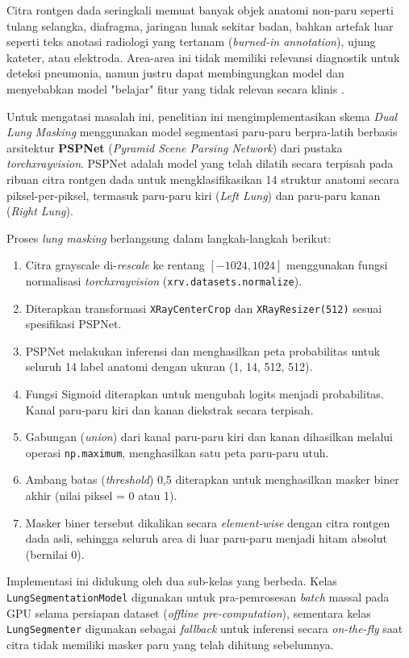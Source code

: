 \documentclass[12pt,a4paper,oneside]{book}
\begin{document}
Citra rontgen dada seringkali memuat banyak objek anatomi non-paru seperti tulang selangka, diafragma, jaringan lunak sekitar badan, bahkan artefak luar seperti teks anotasi radiologi yang tertanam (\textit{burned-in annotation}), ujung kateter, atau elektroda. Area-area ini tidak memiliki relevansi diagnostik untuk deteksi pneumonia, namun justru dapat membingungkan model dan menyebabkan model "belajar" fitur yang tidak relevan secara klinis \parencite{teixeira2020, azimi2022}.

Untuk mengatasi masalah ini, penelitian ini mengimplementasikan skema \textit{Dual Lung Masking} menggunakan model segmentasi paru-paru berpra-latih berbasis arsitektur \textbf{PSPNet} (\textit{Pyramid Scene Parsing Network}) dari pustaka \textit{torchxrayvision}. PSPNet adalah model yang telah dilatih secara terpisah pada ribuan citra rontgen dada untuk mengklasifikasikan 14 struktur anatomi secara piksel-per-piksel, termasuk paru-paru kiri (\textit{Left Lung}) dan paru-paru kanan (\textit{Right Lung}).

Proses \textit{lung masking} berlangsung dalam langkah-langkah berikut:
\begin{enumerate}
  \item Citra grayscale di-\textit{rescale} ke rentang $[-1024, 1024]$ menggunakan fungsi normalisasi \textit{torchxrayvision} (\texttt{xrv.datasets.normalize}).
  \item Diterapkan transformasi \texttt{XRayCenterCrop} dan \texttt{XRayResizer(512)} sesuai spesifikasi PSPNet.
  \item PSPNet melakukan inferensi dan menghasilkan peta probabilitas untuk seluruh 14 label anatomi dengan ukuran (1, 14, 512, 512).
  \item Fungsi Sigmoid diterapkan untuk mengubah logits menjadi probabilitas. Kanal paru-paru kiri dan kanan diekstrak secara terpisah.
  \item Gabungan (\textit{union}) dari kanal paru-paru kiri dan kanan dihasilkan melalui operasi \texttt{np.maximum}, menghasilkan satu peta paru-paru utuh.
  \item Ambang batas (\textit{threshold}) 0,5 diterapkan untuk menghasilkan masker biner akhir (nilai piksel = 0 atau 1).
  \item Masker biner tersebut dikalikan secara \textit{element-wise} dengan citra rontgen dada asli, sehingga seluruh area di luar paru-paru menjadi hitam absolut (bernilai 0).
\end{enumerate}

Implementasi ini didukung oleh dua sub-kelas yang berbeda. Kelas \texttt{LungSegmentationModel} digunakan untuk pra-pemrosesan \textit{batch} massal pada GPU selama persiapan dataset (\textit{offline pre-computation}), sementara kelas \texttt{LungSegmenter} digunakan sebagai \textit{fallback} untuk inferensi secara \textit{on-the-fly} saat citra tidak memiliki masker paru yang telah dihitung sebelumnya.
\end{document}

